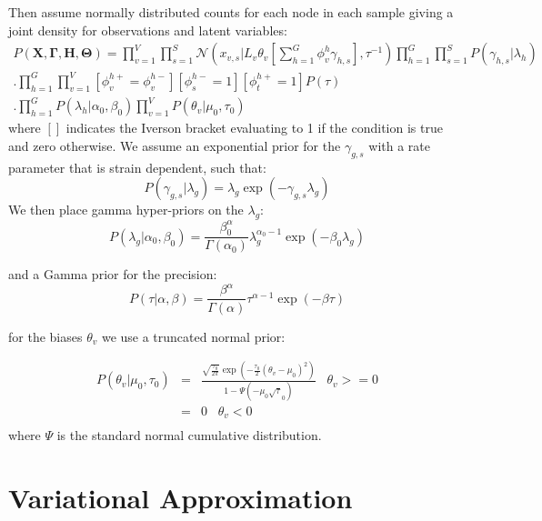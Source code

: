 \documentclass[10pt]{article}
\begin{document}
\noindent Then assume normally distributed counts for each node in each sample giving a joint density for observations and latent variables: 
\begin{multline}
P(\mathbf{X},\mathbf{\Gamma},\mathbf{H},\mathbf{\Theta})  = \prod_{v=1}^V \prod_{s=1}^S \mathcal{N}(x_{v,s}|L_v \theta_v [\sum_{h=1}^G \phi^h_v \gamma_{h,s}],\tau^{-1}) 
\prod_{h=1}^G \prod_{s=1}^S P(\gamma_{h,s} | \lambda_h) \\
.\prod_{h=1}^G \prod_{v=1}^V \left[ \phi^{h+}_v = \phi^{h-}_v \right]
 \left[ \phi^{h-}_s = 1\right]  \left[\phi^{h+}_t = 1\right] P(\tau) \\ .\prod_{h=1}^G P(\lambda_h | \alpha_0, \beta_0) 
 \prod_{v=1}^V P(\theta_v | \mu_0, \tau_0)
\end{multline}
where $\left[\right]$ indicates the Iverson bracket evaluating to 1 if the condition is true and zero otherwise. We assume an exponential prior for the $\gamma_{g,s}$ with a rate parameter that is strain dependent, 
such that:
\begin{equation}
P(\gamma_{g,s}| \lambda_g) = \lambda_g \exp(-\gamma_{g,s} \lambda_g)
\end{equation}
We then place gamma hyper-priors on the $\lambda_g$:
\begin{equation}
P(\lambda_{g}| \alpha_0, \beta_0) =  \frac{\beta_0^\alpha}{\Gamma (\alpha_0)} \lambda_g^{\alpha_0 - 1} \exp(- \beta_0 \lambda_g)
\end{equation}

\noindent and a Gamma prior for the precision:
\begin{equation}
P(\tau | \alpha, \beta) = \frac{\beta^\alpha}{\Gamma(\alpha)} \tau^{\alpha - 1} \exp(-\beta \tau)
\end{equation}

\noindent for the biases $\theta_v$ we use a truncated normal prior:

\begin{align*}
P(\theta_v | \mu_0, \tau_0) & = & \frac{\sqrt{\frac{\tau_0}{2 \pi}}  \exp(- \frac{\tau_0}{2} (\theta_v - \mu_0)^2)  }{1 - \Psi(-\mu_0 \sqrt \tau_0 )}  \;\;\; \theta_v >= 0 \\
                            & = & 0 \;\;\; \theta_v < 0 \\
\end{align*}
where $\Psi$ is the standard normal cumulative distribution. 
%

\section{Variational Approximation}
\end{document}
